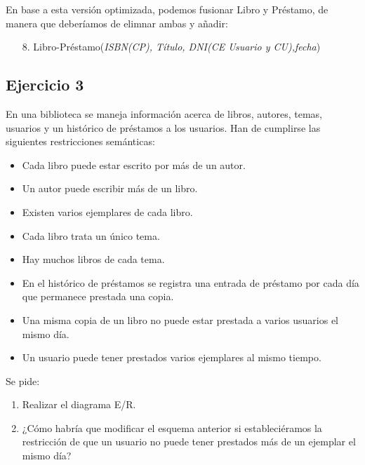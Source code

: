 En base a esta versión optimizada, podemos fusionar Libro y Préstamo, de manera que deberíamos de elimnar ambas y añadir:
\begin{itemize}
    \item[8. ] Libro-Préstamo(\textit{ISBN(CP), Título, DNI(CE Usuario y CU),fecha})
\end{itemize}


\newpage

\subsection*{Ejercicio 3}

\noindent En una biblioteca se maneja información acerca de libros, autores, temas, usuarios y un 
histórico de préstamos a los usuarios. Han de cumplirse las siguientes restricciones 
semánticas: 

\begin{itemize}
    \item Cada libro puede estar escrito por más de un autor.
    \item Un autor puede escribir más de un libro.
    \item Existen varios ejemplares de cada libro.
    \item Cada libro trata un único tema.
    \item Hay muchos libros de cada tema.
    \item En el histórico de préstamos se registra una entrada de préstamo por cada día 
    que permanece prestada una copia.
    \item Una misma copia de un libro no puede estar prestada a varios usuarios el 
    mismo día.
    \item Un usuario puede tener prestados varios ejemplares al mismo tiempo.
\end{itemize}

\noindent Se pide: 

\begin{enumerate}[label=\alph*)]
    \item Realizar el diagrama E/R.
    \item ¿Cómo habría que modificar el esquema anterior si estableciéramos la 
    restricción de que un usuario no puede tener prestados más de un ejemplar el 
    mismo día?
\end{enumerate}

